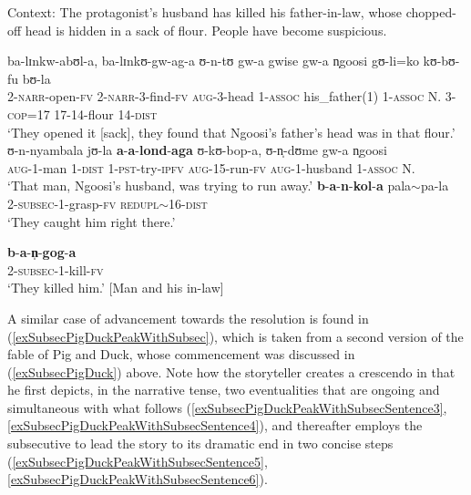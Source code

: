 \begin{exe}
\ex \label{exSubsecAfterIPFVFelbergstory}
Context: The protagonist's husband has killed his father-in-law, whose chopped-off head is hidden in a sack of flour. People have become suspicious.
 \begin{xlist}
\ex \label{exSubsecAfterIPFVFelbergstorySentences2and3} \gll ba-lɪnkw-abʊl-a, ba-lɪnkʊ-gw-ag-a ʊ-n-tʊ gw-a gwise gw-a n̩goosi gʊ-li=ko kʊ-bʊ-fu bʊ-la\\
2-\textsc{narr}-open-\textsc{fv} 2-\textsc{narr}-3-find-\textsc{fv} \textsc{aug}-3-head 1-\textsc{assoc} his\_father(1) 1-\textsc{assoc} N. 3-\textsc{cop}=17 17-14-flour 14-\textsc{dist}\\
\glt `They opened it [sack], they found that Ngoosi's father's head was in that flour.'
\ex \label{exSubsecAfterIPFVFelbergstorySentence4} \gll ʊ-n-nyambala jʊ-la \textbf{a}-\textbf{a}-\textbf{lond}-\textbf{aga} ʊ-kʊ-bop-a, ʊ-n̩-dʊme gw-a n̩goosi\\
\textsc{aug}-1-man 1-\textsc{dist} 1-\textsc{pst}-try-\textsc{ipfv} \textsc{aug}-15-run-\textsc{fv} \textsc{aug}-1-husband 1-\textsc{assoc} N.\\
\glt `That man, Ngoosi's husband, was trying to run away.'
\ex \label{exSubsecAfterIPFVFelbergstorySentence5} \gll \textbf{b}-\textbf{a}-\textbf{n}-\textbf{kol}-\textbf{a} pala$\sim$pa-la\\
2-\textsc{subsec}-1-grasp-\textsc{fv} \textsc{redupl}$\sim$16-\textsc{dist}\\
\glt `They caught him right there.'


\ex \label{exSubsecAfterIPFVFelbergstorySentence6} \gll \textbf{b}-\textbf{a}-\textbf{n̩}-\textbf{gog}-\textbf{a}\\
2-\textsc{subsec}-1-kill-\textsc{fv}\\
\glt `They killed him.' [Man and his in-law]
\end{xlist}
\end{exe}

A similar case of advancement towards the resolution is found in (\ref{exSubsecPigDuckPeakWithSubsec}), which is taken from a second version of the fable of Pig and Duck, whose commencement was discussed in (\ref{exSubsecPigDuck}) above. Note how the storyteller creates a crescendo in that he first depicts, in the narrative tense, two eventualities that are ongoing and simultaneous with what follows (\ref{exSubsecPigDuckPeakWithSubsecSentence3}, \ref{exSubsecPigDuckPeakWithSubsecSentence4}), and thereafter employs the subsecutive to lead the story to its dramatic end in two concise steps (\ref{exSubsecPigDuckPeakWithSubsecSentence5}, \ref{exSubsecPigDuckPeakWithSubsecSentence6}). 

